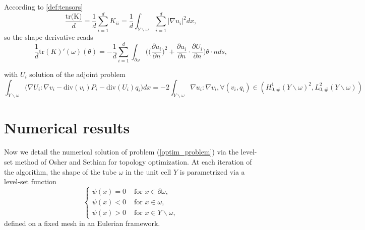 \documentclass{article}
\begin{document}
{
\cor
According to \eqref{def:tensors}
\begin{equation*}
\frac{\mbox{tr(K)}}{d}=\frac{1}{d}\sum_{i=1}^d K_{ii}=\frac{1}{d}\int_{Y\backslash \omega}\sum_{i=1}^d |\nabla u_i|^2dx,
\end{equation*}
so the shape derivative reads
\begin{equation*}
\frac{1}{d}\text{tr}(K)'(\omega)(\theta)=-\frac{1}{d}\sum_{i=1}^d\int_{\partial \omega}  \Big(\big(\frac{\partial u_i}{\partial n}\big)^2+\frac{\partial  u_i}{\partial n} \cdot \frac{\partial U_i}{\partial n}\Big)\theta \cdot nds,
\end{equation*}
 


with $U_i$ solution of the adjoint problem 
\begin{equation*}
\int_{Y\backslash \omega}\Big(\nabla U_i : \nabla v_i -\text{div}(v_i)P_i - \mbox{div}(U_i) q_i\Big) dx =-2 \int_{Y\backslash \omega} \nabla u_i: \nabla v_i,
\forall (v_i,q_i)\in (H_{0,\#}^1(Y\backslash \omega)^2,L^2_{0,\#}(Y\backslash \omega))
\end{equation*}
}


\section{Numerical results}
\label{numerical_results_fuel_cell}


Now we detail the numerical solution of problem (\ref{optim_problem}) {via the} level-set method of Osher and Sethian \cite{osher.sethian} for topology optimization. At each iteration of the algorithm, the shape of the tube $\omega$ in the unit cell $Y$ is parametrized via a level-set function
$$
\left\{ \begin{array}{ll}
\psi(x) = 0 & \mbox{ for } x\in\partial \omega,  \\
\psi(x) < 0 &  \mbox{ for } x\in\omega, \\
\psi(x) > 0 & \mbox{ for } x\in Y\backslash\omega,
\end{array}
\right.
$$
defined on a fixed mesh in an Eulerian framework. 
\end{document}
